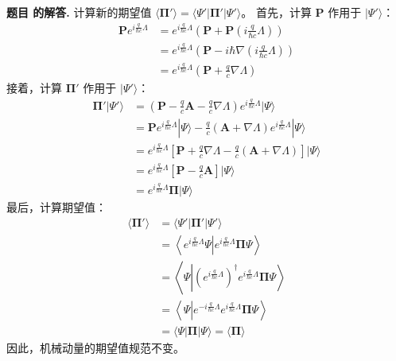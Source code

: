 \documentclass[12pt, a4paper, oneside]{ctexart}
\newcounter{problemname}
\newenvironment{solution}
  {\par\noindent\textbf{题目 \theproblemname 的解答. }}
  {\par}
\begin{document}
\begin{solution}
计算新的期望值 $\langle \boldsymbol{\Pi}' \rangle = \langle \Psi' | \boldsymbol{\Pi}' | \Psi' \rangle$。
首先，计算 $\mathbf{P}$ 作用于 $| \Psi' \rangle$：
\begin{align*}
\mathbf{P} e^{i \frac{q}{\hbar c} \Lambda} &= e^{i \frac{q}{\hbar c} \Lambda} \left( \mathbf{P} + \mathbf{P}\left(i \frac{q}{\hbar c} \Lambda\right) \right) \\
&= e^{i \frac{q}{\hbar c} \Lambda} \left( \mathbf{P} - i\hbar \nabla \left(i \frac{q}{\hbar c} \Lambda\right) \right) \\
&= e^{i \frac{q}{\hbar c} \Lambda} \left( \mathbf{P} + \frac{q}{c} \nabla \Lambda \right)
\end{align*}
接着，计算 $\boldsymbol{\Pi}'$ 作用于 $| \Psi' \rangle$：
\begin{align*}
\boldsymbol{\Pi}' | \Psi' \rangle &= (\mathbf{P} - \frac{q}{c} \mathbf{A} - \frac{q}{c} \nabla \Lambda) e^{i \frac{q}{\hbar c} \Lambda} | \Psi \rangle \\
&= \mathbf{P} e^{i \frac{q}{\hbar c} \Lambda} | \Psi \rangle - \frac{q}{c} (\mathbf{A} + \nabla \Lambda) e^{i \frac{q}{\hbar c} \Lambda} | \Psi \rangle \\
&= e^{i \frac{q}{\hbar c} \Lambda} \left[ \mathbf{P} + \frac{q}{c} \nabla \Lambda - \frac{q}{c} (\mathbf{A} + \nabla \Lambda) \right] | \Psi \rangle \\
&= e^{i \frac{q}{\hbar c} \Lambda} \left[ \mathbf{P} - \frac{q}{c} \mathbf{A} \right] | \Psi \rangle \\
&= e^{i \frac{q}{\hbar c} \Lambda} \boldsymbol{\Pi} | \Psi \rangle
\end{align*}
最后，计算期望值：
\begin{align*}
\langle \boldsymbol{\Pi}' \rangle &= \langle \Psi' | \boldsymbol{\Pi}' | \Psi' \rangle \\
&= \left\langle e^{i \frac{q}{\hbar c} \Lambda} \Psi \left| e^{i \frac{q}{\hbar c} \Lambda} \boldsymbol{\Pi} \Psi \right\rangle \right. \\
&= \left\langle \Psi \left| \left( e^{i \frac{q}{\hbar c} \Lambda} \right)^\dagger e^{i \frac{q}{\hbar c} \Lambda} \boldsymbol{\Pi} \Psi \right\rangle \right. \\
&= \left\langle \Psi \left| e^{-i \frac{q}{\hbar c} \Lambda} e^{i \frac{q}{\hbar c} \Lambda} \boldsymbol{\Pi} \Psi \right\rangle \right. \\
&= \langle \Psi | \boldsymbol{\Pi} | \Psi \rangle = \langle \boldsymbol{\Pi} \rangle
\end{align*}
因此，机械动量的期望值规范不变。

\end{solution}
\end{document}
